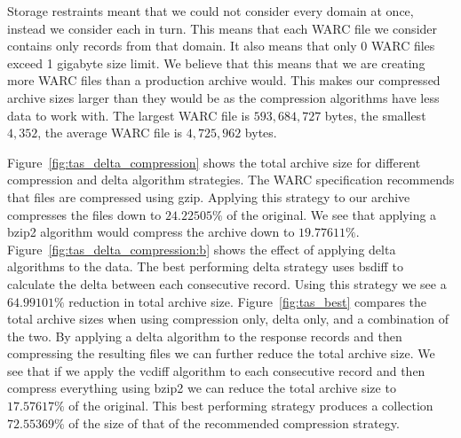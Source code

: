 \documentclass[11pt]{article}
\def \gzipcompressionpct {24.22505}
\def \bzipcompressionpct {19.77611}
\def \beststrategypct {17.57617}
\def \bestdeltapct {64.99101}
\def \bestvsgzippct {72.55369}
\def \largewarccount {0}
\def \meanwarcsize {4,725,962}
\def \maxwarcsize {593,684,727}
\def \minwarcsize {4,352}
\begin{document}
    Storage restraints meant that we could not consider every domain at once, instead we consider each in turn. This means that each WARC file we consider contains only records from that domain. It also means that only $\largewarccount$ WARC files exceed 1 gigabyte size limit. We believe that this means that we are creating more WARC files than a production archive would. This makes our compressed archive sizes larger than they would be as the compression algorithms have less data to work with. The largest WARC file is $\maxwarcsize$ bytes, the smallest $\minwarcsize$, the average WARC file is $\meanwarcsize$ bytes.

    Figure~\ref{fig:tas_delta_compression} shows the total archive size for different compression and delta algorithm strategies. The WARC specification recommends that files are compressed using gzip. Applying this strategy to our archive compresses the files down to $\gzipcompressionpct\%$ of the original. We see that applying a bzip2 algorithm would compress the archive down to $\bzipcompressionpct\%$. Figure~\ref{fig:tas_delta_compression:b} shows the effect of applying delta algorithms to the data. The best performing delta strategy uses bsdiff to calculate the delta between each consecutive record. Using this strategy we see a $\bestdeltapct\%$ reduction in total archive size. Figure~\ref{fig:tas_best} compares the total archive sizes when using compression only, delta only, and a combination of the two. By applying a delta algorithm to the response records and then compressing the resulting files we can further reduce the total archive size. We see that if we apply the vcdiff algorithm to each consecutive record and then compress everything using bzip2 we can reduce the total archive size to $\beststrategypct\%$ of the original. This best performing strategy produces a collection $\bestvsgzippct\%$ of the size of that of the recommended compression strategy.
\end{document}
